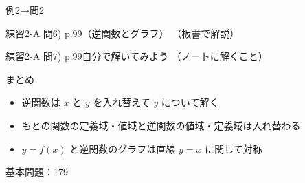\documentclass[aspectratio=43,professionalfonts,handout]{beamer}
\begin{document}
\begin{frame}{例2→問2}
  \begin{exampleblock}{練習2-A 問6) p.99（逆関数とグラフ）}
    （板書で解説）
  \end{exampleblock}

  \vfill

  \begin{block}{練習2-A 問7) p.99\quad 自分で解いてみよう}
    （ノートに解くこと）
  \end{block}
\end{frame}

\begin{frame}{まとめ}
  \begin{itemize}
    \item 逆関数は $x$ と $y$ を入れ替えて $y$ について解く
    \item もとの関数の定義域・値域と逆関数の値域・定義域は入れ替わる
    \item $y=f(x)$ と逆関数のグラフは直線 $y=x$ に関して対称
  \end{itemize}

  \vfill
  {\small 基本問題：179}
\end{frame}
\end{document}
